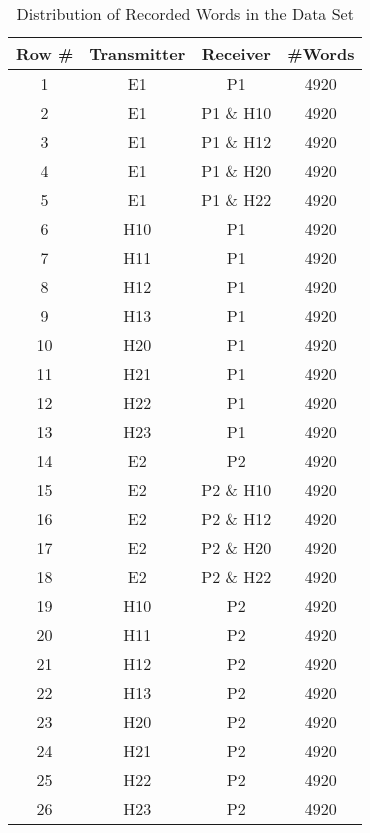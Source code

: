 \documentclass[conference]{IEEEtran}
\begin{document}
  \begin{table}
    \caption{Distribution of Recorded Words in the Data Set}
    \label{tab:RecordingsSummery}
    \centering
    \begin{tabular}{|c | c c c|} 
      \hline
      Row \# & Transmitter & Receiver & \#Words \\ [0.5ex] 
      \hline\hline
      1 & E1 & P1 & 4920 \\ %
      \hline
      2 & E1 & P1 \& H10 & 4920 \\
      \hline
      3 & E1 & P1 \& H12 & 4920 \\
      \hline
      4 & E1 & P1 \& H20 & 4920 \\
      \hline
      5 & E1 & P1 \& H22 & 4920 \\
      \hline
      6 & H10 & P1 & 4920 \\
      \hline
      7 & H11 & P1 & 4920 \\
      \hline
      8 & H12 & P1 & 4920 \\
      \hline
      9 & H13 & P1 & 4920 \\
      \hline
      10 & H20 & P1 & 4920 \\
      \hline
      11 & H21 & P1 & 4920 \\
      \hline
      12 & H22 & P1 & 4920 \\
      \hline
      13 & H23 & P1 & 4920 \\
      \hline
      14 & E2 & P2 & 4920 \\ %
      \hline
      15 & E2 & P2 \& H10 & 4920 \\
      \hline
      16 & E2 & P2 \& H12 & 4920 \\
      \hline
      17 & E2 & P2 \& H20 & 4920 \\
      \hline
      18 & E2 & P2 \& H22 & 4920 \\
      \hline
      19 & H10 & P2 & 4920 \\
      \hline
      20 & H11 & P2 & 4920 \\
      \hline
      21 & H12 & P2 & 4920 \\
      \hline
      22 & H13 & P2 & 4920 \\
      \hline
      23 & H20 & P2 & 4920 \\
      \hline
      24 & H21 & P2 & 4920 \\
      \hline
      25 & H22 & P2 & 4920 \\
      \hline
      26 & H23 & P2 & 4920 \\
      \hline
    \end{tabular}
  \end{table}
  
\end{document}
